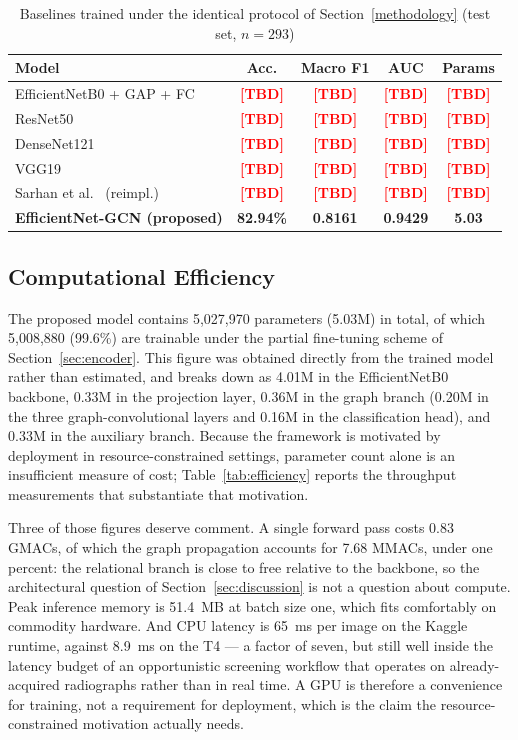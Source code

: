 \documentclass[journal]{IEEEtran}
\newcommand{\PEND}{\textcolor{red}{\textbf{[TBD]}}}
\begin{document}
\begin{table}[!t]
\centering
\caption{Baselines trained under the identical protocol of
Section~\ref{methodology} (test set, $n=293$)}
\label{tab:baselines}
\scriptsize
\setlength{\tabcolsep}{4pt}
\begin{tabular}{@{}p{3.0cm} c c c c@{}}
\toprule
\textbf{Model} & \textbf{Acc.} & \textbf{Macro F1} & \textbf{AUC} &
\textbf{Params} \\
\midrule
EfficientNetB0 + GAP + FC & \PEND & \PEND & \PEND & \PEND \\
ResNet50 & \PEND & \PEND & \PEND & \PEND \\
DenseNet121 & \PEND & \PEND & \PEND & \PEND \\
VGG19 & \PEND & \PEND & \PEND & \PEND \\
Sarhan et al.~\cite{Sarhan2024} (reimpl.) & \PEND & \PEND & \PEND & \PEND \\
\midrule
\textbf{EfficientNet-GCN (proposed)} & \textbf{82.94\%} & \textbf{0.8161} &
\textbf{0.9429} & \textbf{5.03} \\
\bottomrule
\end{tabular}
\end{table}

\subsection{Computational Efficiency}
\label{sec:efficiency}
The proposed model contains 5,027,970 parameters (5.03M) in total, of which
5,008,880 (99.6\%) are trainable under the partial fine-tuning scheme of
Section~\ref{sec:encoder}. This figure was obtained directly from the trained
model rather than estimated, and breaks down as 4.01M in the EfficientNetB0
backbone, 0.33M in the projection layer, 0.36M in the graph branch (0.20M in the
three graph-convolutional layers and 0.16M in the classification head), and
0.33M in the auxiliary branch. Because the framework is motivated by deployment
in resource-constrained settings, parameter count alone is an insufficient
measure of cost; Table~\ref{tab:efficiency} reports the throughput measurements
that substantiate that motivation.

Three of those figures deserve comment. A single forward pass costs 0.83
GMACs, of which the graph propagation accounts for 7.68 MMACs, under one
percent: the relational branch is close to free relative to the backbone, so the
architectural question of Section~\ref{sec:discussion} is not a question about
compute. Peak inference memory is 51.4~MB at batch size one, which fits
comfortably on commodity hardware. And CPU latency is 65~ms per image on the
Kaggle runtime, against 8.9~ms on the T4 --- a factor of seven, but still well
inside the latency budget of an opportunistic screening workflow that operates
on already-acquired radiographs rather than in real time. A GPU is therefore a
convenience for training, not a requirement for deployment, which is the claim
the resource-constrained motivation actually needs.
\end{document}
